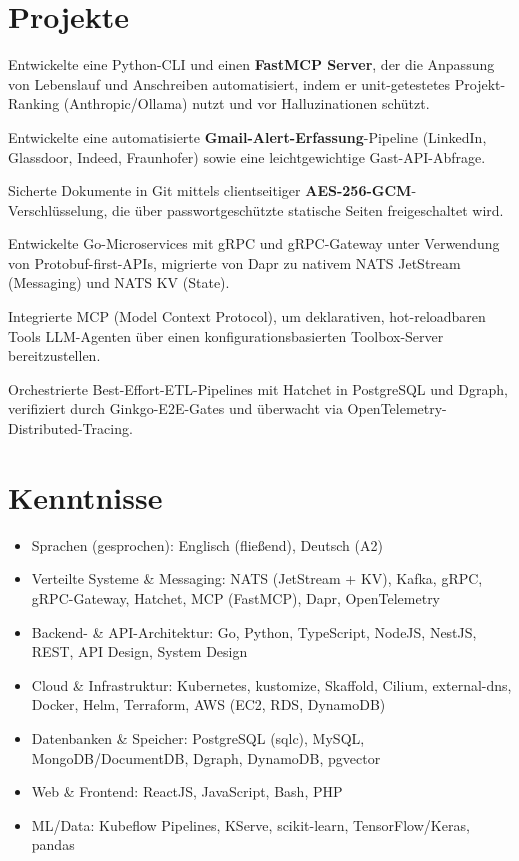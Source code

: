 \documentclass[10pt,a4paper]{resume}
\begin{document}
\section{Projekte}

\bullets
  \item Entwickelte eine Python-CLI und einen \textbf{FastMCP Server}, der die Anpassung von Lebenslauf und Anschreiben automatisiert, indem er unit-getestetes Projekt-Ranking (Anthropic/Ollama) nutzt und vor Halluzinationen schützt.
  \item Entwickelte eine automatisierte \textbf{Gmail-Alert-Erfassung}-Pipeline (LinkedIn, Glassdoor, Indeed, Fraunhofer) sowie eine leichtgewichtige Gast-API-Abfrage.
  \item Sicherte Dokumente in Git mittels clientseitiger \textbf{AES-256-GCM}-Verschlüsselung, die über passwortgeschützte statische Seiten freigeschaltet wird.
\bulletsend
\vspace{1.0pt}
\bullets
  \item Entwickelte Go-Microservices mit gRPC und gRPC-Gateway unter Verwendung von Protobuf-first-APIs, migrierte von Dapr zu nativem NATS JetStream (Messaging) und NATS KV (State).
  \item Integrierte MCP (Model Context Protocol), um deklarativen, hot-reloadbaren Tools LLM-Agenten über einen konfigurationsbasierten Toolbox-Server bereitzustellen.
  \item Orchestrierte Best-Effort-ETL-Pipelines mit Hatchet in PostgreSQL und Dgraph, verifiziert durch Ginkgo-E2E-Gates und überwacht via OpenTelemetry-Distributed-Tracing.
\bulletsend

\section{Kenntnisse}

\begin{itemize}[leftmargin=1.4em,nosep,topsep=2pt]
  \item Sprachen (gesprochen): Englisch (fließend), Deutsch (A2)
  \item Verteilte Systeme \& Messaging: NATS (JetStream + KV), Kafka, gRPC, gRPC-Gateway, Hatchet, MCP (FastMCP), Dapr, OpenTelemetry
  \item Backend- \& API-Architektur: Go, Python, TypeScript, NodeJS, NestJS, REST, API Design, System Design
  \item Cloud \& Infrastruktur: Kubernetes, kustomize, Skaffold, Cilium, external-dns, Docker, Helm, Terraform, AWS (EC2, RDS, DynamoDB)
  \item Datenbanken \& Speicher: PostgreSQL (sqlc), MySQL, MongoDB/DocumentDB, Dgraph, DynamoDB, pgvector
  \item Web \& Frontend: ReactJS, JavaScript, Bash, PHP
  \item ML/Data: Kubeflow Pipelines, KServe, scikit-learn, TensorFlow/Keras, pandas
\end{itemize}
\end{document}
